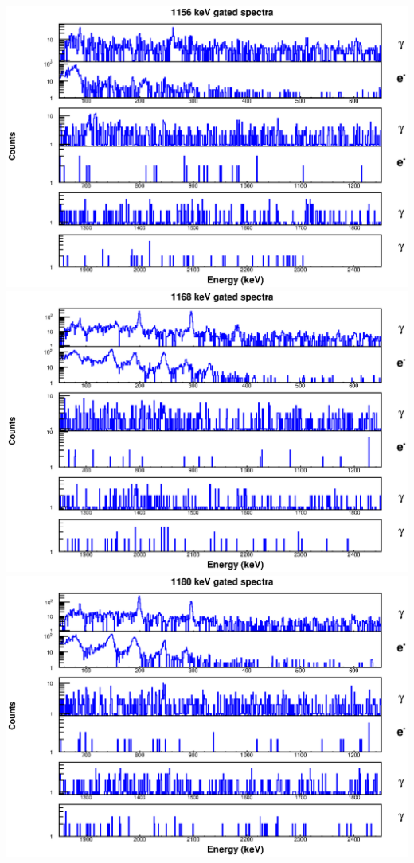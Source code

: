 \includegraphics[scale=0.8]{156Gd_Appendix/1156_combined.eps}
\includegraphics[scale=0.8]{156Gd_Appendix/1168_combined.eps}
\includegraphics[scale=0.8]{156Gd_Appendix/1180_combined.eps}
